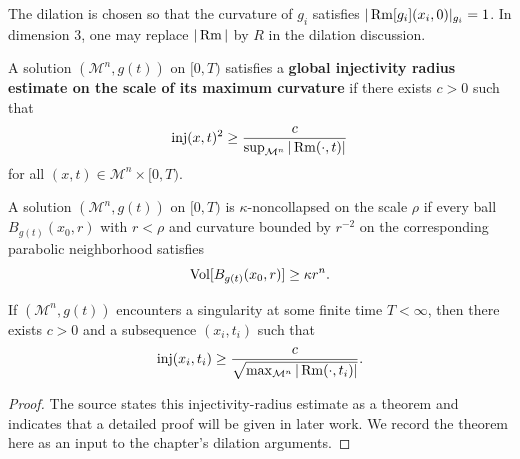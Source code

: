 \begin{remark}
\label{ch08-rem-dilation-normalization}
The dilation is chosen so that the curvature of \(g_i\) satisfies \(|\operatorname{Rm}[g_i](x_i,0)|_{g_i}=1\). In dimension \(3\), one may replace \(|\operatorname{Rm}|\) by \(R\) in the dilation discussion.
\end{remark}

\begin{definition}
\label{ch08-def-global-injectivity-radius-estimate}
A solution \((\mathcal M^n,g(t))\) on \([0,T)\) satisfies a \textbf{global injectivity radius estimate on the scale of its maximum curvature} if there exists \(c>0\) such that
\[
\operatorname{inj}(x,t)^2\ge \frac{c}{\sup_{\mathcal M^n}|\operatorname{Rm}(\cdot,t)|}
\]
for all \((x,t)\in\mathcal M^n\times[0,T)\).
\end{definition}

\begin{definition}
\label{ch08-def-kappa-noncollapsed}
A solution \((\mathcal M^n,g(t))\) on \([0,T)\) is \(\kappa\)-noncollapsed on the scale \(\rho\) if every ball \(B_{g(t)}(x_0,r)\) with \(r<\rho\) and curvature bounded by \(r^{-2}\) on the corresponding parabolic neighborhood satisfies
\[
\operatorname{Vol}[B_{g(t)}(x_0,r)]\ge \kappa r^n.
\]
\end{definition}

\begin{theorem}
\label{ch08-thm-perelman-injectivity-estimate}
If \((\mathcal M^n,g(t))\) encounters a singularity at some finite time \(T<\infty\), then there exists \(c>0\) and a subsequence \((x_i,t_i)\) such that
\[
\operatorname{inj}(x_i,t_i)\ge \frac{c}{\sqrt{\max_{\mathcal M^n}|\operatorname{Rm}(\cdot,t_i)|}}.
\]
\end{theorem}

\begin{proof}
The source states this injectivity-radius estimate as a theorem and indicates that a detailed proof will be given in later work. We record the theorem here as an input to the chapter's dilation arguments.
\end{proof}

